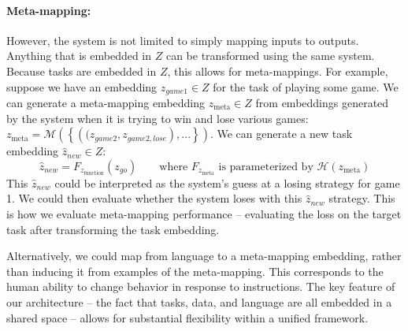 \documentclass{article}
\begin{document}
\paragraph{Meta-mapping:} However, the system is not limited to simply mapping inputs to outputs. Anything that is embedded in $Z$ can be transformed using the same system. Because tasks are embedded in $Z$, this allows for meta-mappings. For example, suppose we have an embedding $z_{game1} \in Z$ for the task of playing some game. We can generate a meta-mapping embedding $z_{\text{meta}} \in Z$ from embeddings generated by the system when it is trying to win and lose various games: $z_{\text{meta}} = \mathcal{M}\left( \left\{\left((z_{game2},z_{game2,lose}\right), ... \right\}\right)$. We can generate a new task embedding $\hat{z}_{new} \in Z$:  
\[\hat{z}_{new} = F_{z_{\text{function}}}(z_{go}) \qquad \text{where } F_{z_{\text{meta}}} \text{ is parameterized by } \mathcal{H}\left(z_{\text{meta}}\right)\]
This $\hat{z}_{new}$ could be interpreted as the system's guess at a losing strategy for game 1. We could then evaluate whether the system loses with this $\hat{z}_{new}$ strategy. This is how we evaluate meta-mapping performance -- evaluating the loss on the target task after transforming the task embedding. \par
Alternatively, we could map from language to a meta-mapping embedding, rather than inducing it from examples of the meta-mapping. This corresponds to the human ability to change behavior in response to instructions. The key feature of our architecture -- the fact that tasks, data, and language are all embedded in a shared space -- allows for substantial flexibility within a unified framework. 

%
\end{document}
